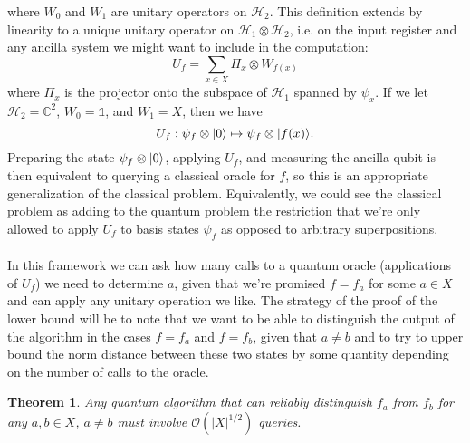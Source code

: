 \documentclass[]{article}
\newcommand{\modulus}[1]{\left\vert#1\right\vert}
\theoremstyle{plain}
\newtheorem{theorem}{Theorem}
\theoremstyle{definition}
\theoremstyle{remark}
\begin{document}
where $W_0$ and $W_1$ are unitary operators on $\mathcal{H}_2$. This definition extends by linearity to a unique unitary operator on $\mathcal{H}_1\otimes\mathcal{H}_2$, i.e. on the input register and any ancilla system we might want to include in the computation:
\begin{equation}
U_f=\sum_{x\in X}\Pi_x\otimes W_{f(x)}
\end{equation}
where $\Pi_x$ is the projector onto the subspace of $\mathcal{H}_1$ spanned by $\psi_x$. If we let $\mathcal{H}_2=\mathbb{C}^2$, $W_0=\mathbb{1}$, and $W_1=X$, then we have
\begin{equation}
U_f:\psi_f\otimes{\left\vert{0}\right\rangle}\mapsto\psi_f\otimes{\left\vert{f(x)}\right\rangle}.
\end{equation}
Preparing the state $\psi_f\otimes{\left\vert{0}\right\rangle}$, applying $U_f$, and measuring the ancilla qubit is then equivalent to querying a classical oracle for $f$, so this is an appropriate generalization of the classical problem. Equivalently, we could see the classical problem as adding to the quantum problem the restriction that we're only allowed to apply $U_f$ to basis states $\psi_f$ as opposed to arbitrary superpositions.\\
\\
In this framework we can ask how many calls to a quantum oracle (applications of $U_f$) we need to determine $a$, given that we're promised $f=f_a$ for some $a\in X$ and can apply any unitary operation we like. The strategy of the proof of the lower bound will be to note that we want to be able to distinguish the output of the algorithm in the cases $f=f_a$ and $f=f_{b}$, given that $a\neq b$ and to try to upper bound the norm distance between these two states by some quantity depending on the number of calls to the oracle.

\begin{theorem}
Any quantum algorithm that can reliably distinguish $f_a$ from $f_b$ for any $a,b\in X$, $a\neq b$ must involve $\mathcal{O}(\modulus{X}^{1/2})$ queries.
\end{theorem}
\end{document}
